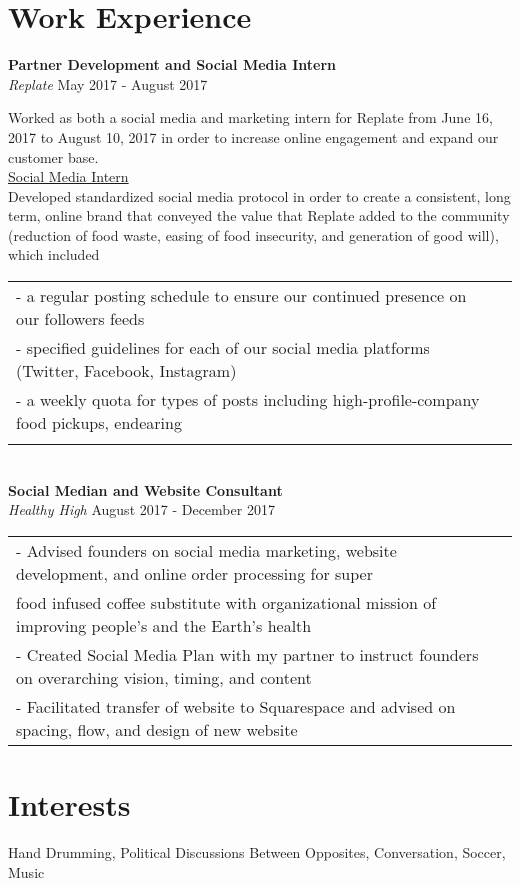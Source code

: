 \documentclass{article}
\begin{document}
\section*{Work Experience}
\begin{flushleft}

\textbf{Partner Development and Social Media Intern} \\
\textit{Replate}
\hfill
May 2017 - August 2017

Worked as both a social media and marketing intern for Replate from June 16, 2017 to August 10, 2017 in order to increase online engagement and expand our customer base. \\

\underline{Social Media Intern} \\
Developed standardized social media protocol in order to create a consistent, long term, online brand that conveyed the value that Replate added to the community (reduction of food waste, easing of food insecurity, and generation of good will), which included
\begin{tabular}{l c}
- a regular posting schedule to ensure our continued presence on our followers feeds \\
- specified guidelines for each of our social media platforms (Twitter, Facebook, Instagram) \\
- a weekly quota for types of posts including high-profile-company food pickups, endearing\\ \\
\end{tabular} \\
 
\textbf{Social Median and Website Consultant} \\
\textit{Healthy High}
\hfill
August 2017 - December 2017
\begin{tabular}{l c}
- Advised founders on social media marketing, website development, and online order processing for super \\
food infused coffee substitute with organizational mission of improving people’s and the Earth’s health \\
- Created Social Media Plan with my partner to instruct founders on overarching vision, timing, and content \\
- Facilitated transfer of website to Squarespace and advised on spacing, flow, and design of new website

\end{tabular}
\section*{Interests}
Hand Drumming, Political Discussions Between Opposites, Conversation, Soccer, Music
\end{flushleft}
\end{document}
